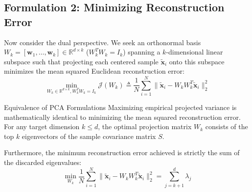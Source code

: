 \subsection{Formulation 2: Minimizing Reconstruction Error}
Now consider the dual perspective. We seek an orthonormal basis $W_k = [\mathbf{w}_1, \dots, \mathbf{w}_k] \in \mathbb{R}^{d \times k}$ ($W_k^T W_k = I_k$) spanning a $k$-dimensional linear subspace such that projecting each centered sample $\tilde{\mathbf{x}}_i$ onto this subspace minimizes the mean squared Euclidean reconstruction error:
\begin{equation}
\min_{W_k \in \mathbb{R}^{d \times k}, W_k^T W_k = I_k} \mathcal{J}(W_k) \triangleq \frac{1}{N} \sum_{i=1}^N \|\tilde{\mathbf{x}}_i - W_k W_k^T \tilde{\mathbf{x}}_i\|_2^2
\label{eq:pca_recon_opt}
\end{equation}

\begin{theorembox}{Equivalence of PCA Formulations}
\label{thm:pca_equivalence}
Maximizing empirical projected variance is mathematically identical to minimizing the mean squared reconstruction error. For any target dimension $k \le d$, the optimal projection matrix $W_k$ consists of the top $k$ eigenvectors of the sample covariance matrix $S$.

Furthermore, the minimum reconstruction error achieved is strictly the sum of the discarded eigenvalues:
\begin{equation}
\min_{W_k} \frac{1}{N}\sum_{i=1}^N \|\tilde{\mathbf{x}}_i - W_k W_k^T \tilde{\mathbf{x}}_i\|_2^2 = \sum_{j=k+1}^d \lambda_j
\label{eq:pca_error_sum}
\end{equation}
\end{theorembox}


